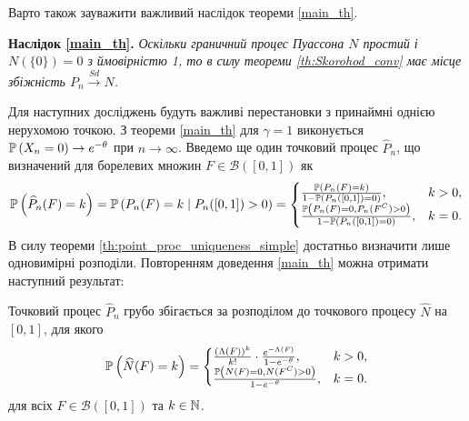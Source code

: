 Варто також зауважити важливий наслідок теореми \ref{main_th}.

\vspace{10pt}
\noindent
\textbf{Наслідок \ref{main_th}.}
\textit{Оскільки граничний процес Пуассона $N$ простий і $N\left(\{0\}\right) = 0$ з ймовірністю 1, то в силу теореми
\ref{th:Skorohod_conv} має місце збіжність $P_n \overset{Sd}{\longrightarrow} N$.}
\vspace{10pt}

Для наступних досліджень будуть важливі перестановки з принаймні однією нерухомою точкою.
З теореми \ref{main_th} для $\gamma = 1$ виконується $\P{X_n = 0} \to e^{-\theta}$ при $n \to \infty$. 
Введемо ще один точковий процес $\widehat{P}_n$, що визначений для борелевих множин $F \in \mathcal{B}([0, 1])$ як 
\begin{gather*}
    \P{\widehat{P}_n (F) = k} = \P{P_n(F) = k \mid P_n([0, 1]) > 0} = \begin{cases}
        \frac{\P{P_n(F) = k}}{1 - \P{P_n([0, 1]) = 0}}, & k > 0, \\
        \frac{\P{P_n(F) = 0, P_n(F^C) > 0}}{1 - \P{P_n([0, 1]) = 0}}, & k = 0.
    \end{cases} 
\end{gather*}
В силу теореми \ref{th:point_proc_uniqueness_simple} достатньо визначити лише одновимірні розподіли.
Повторенням доведення \ref{main_th} можна отримати наступний результат:
\begin{theorem}\label{cond_th}
    Точковий процес $\widehat{P}_n$ грубо збігається за розподілом до точкового процесу $\widehat{N}$ на $[0, 1]$, 
    для якого
    \begin{gather}\label{Pn_cond_def}
        \P{\widehat{N} (F) = k} =
        \begin{cases}
            \frac{(\Lambda(F))^k}{k!} \cdot \frac{e^{-\Lambda(F)}}{1 - e^{-\theta}}, & k > 0, \\
            \frac{\P{N(F) = 0, N(F^C) > 0}}{1 - e^{-\theta}}, & k = 0.
        \end{cases}
    \end{gather}
    для всіх $F \in \mathcal{B}([0, 1])$ та $k \in \N$.
\end{theorem}
